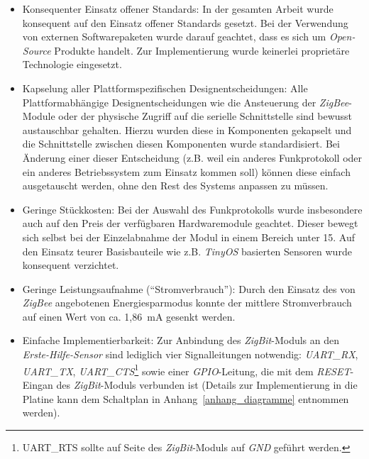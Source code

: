 \begin{itemize}
    \item{Konsequenter Einsatz offener Standards:} In der gesamten Arbeit wurde konsequent auf den
          Einsatz offener Standards gesetzt. Bei der Verwendung von externen Softwarepaketen wurde
          darauf geachtet, dass es sich um \emph{Open-Source} Produkte handelt. Zur Implementierung
          wurde keinerlei proprietäre Technologie eingesetzt.

    \item{Kapselung aller Plattformspezifischen Designentscheidungen:} Alle Plattformabhängige
          Designentscheidungen wie die Ansteuerung der \emph{ZigBee}-Module oder der
          physische Zugriff auf die serielle Schnittstelle sind bewusst austauschbar gehalten.
          Hierzu wurden diese in Komponenten gekapselt und die Schnittstelle zwischen diesen
          Komponenten wurde standardisiert. Bei Änderung einer dieser Entscheidung (z.B.
          weil ein anderes Funkprotokoll oder ein anderes Betriebssystem zum Einsatz kommen soll)
          können diese einfach ausgetauscht werden, ohne den Rest des Systems anpassen zu 
          müssen.

    \item{Geringe Stückkosten:} Bei der Auswahl des Funkprotokolls wurde insbesondere auch auf den
          Preis der verfügbaren Hardwaremodule geachtet. Dieser bewegt sich selbst bei der
          Einzelabnahme der Modul in einem Bereich unter 15\EUR{}. Auf den Einsatz teurer
          Basisbauteile wie z.B. \emph{TinyOS} basierten Sensoren wurde konsequent verzichtet.

    \item{Geringe Leistungsaufnahme ("`Stromverbrauch"'):} Durch den Einsatz des von \emph{ZigBee}
          angebotenen Energiesparmodus konnte der mittlere Stromverbrauch auf einen Wert von ca. 
          1,86~mA gesenkt werden.

    \item{Einfache Implementierbarkeit:} Zur Anbindung des \emph{ZigBit}-Moduls an den \emph{Erste-Hilfe-Sensor}
          sind lediglich vier Signalleitungen notwendig: \emph{UART\_RX}, \emph{UART\_TX}, 
          \emph{UART\_CTS}\footnote{UART\_RTS sollte auf Seite des \emph{ZigBit}-Moduls auf \emph{GND}
              geführt werden.} sowie einer \emph{GPIO}-Leitung, die mit dem \emph{RESET}-Eingan des
          \emph{ZigBit}-Moduls verbunden ist (Details zur Implementierung in die Platine kann dem
          Schaltplan in Anhang~\ref{anhang_diagramme} entnommen werden). 


\end{itemize}
